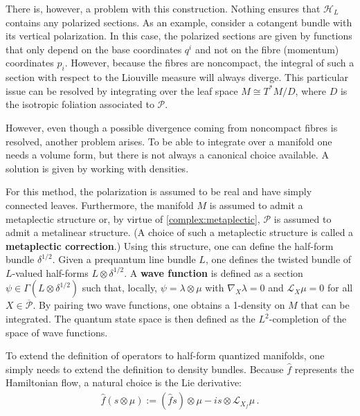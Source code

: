 \begin{construct}
        There is, however, a problem with this construction. Nothing ensures that $\mathcal{H}_L$ contains any polarized sections. As an example, consider a cotangent bundle with its vertical polarization. In this case, the polarized sections are given by functions that only depend on the base coordinates $q^i$ and not on the fibre (momentum) coordinates $p_i$. However, because the fibres are noncompact, the integral of such a section with respect to the Liouville measure will always diverge. This particular issue can be resolved by integrating over the leaf space $M\cong T^*M/D$, where $D$ is the isotropic foliation associated to $\mathcal{P}$.
    \end{construct}

    However, even though a possible divergence coming from noncompact fibres is resolved, another problem arises. To be able to integrate over a manifold one needs a volume form, but there is not always a canonical choice available. A solution is given by working with densities.
    \begin{method}\label{quantization:half_form}
        For this method, the polarization is assumed to be real and have simply connected leaves. Furthermore, the manifold $M$ is assumed to admit a metaplectic structure or, by virtue of \cref{complex:metaplectic}, $\mathcal{P}$ is assumed to admit a metalinear structure. (A choice of such a metaplectic structure is called a \textbf{metaplectic correction}.) Using this structure, one can define the half-form bundle $\delta^{1/2}$. Given a prequantum line bundle $L$, one defines the twisted bundle of $L$-valued half-forms $L\otimes\delta^{1/2}$. A \textbf{wave function} is defined as a section $\psi\in\Gamma(L\otimes\delta^{1/2})$ such that, locally, $\psi=\lambda\otimes\mu$ with $\nabla_X\lambda=0$ and $\mathcal{L}_X\mu=0$ for all $X\in\overline{\mathcal{P}}$. By pairing two wave functions, one obtains a 1-density on $M$ that can be integrated. The quantum state space is then defined as the $L^2$-completion of the space of wave functions.

        To extend the definition of operators to half-form quantized manifolds, one simply needs to extend the definition to density bundles. Because $\widehat{f}$ represents the Hamiltonian flow, a natural choice is the Lie derivative:
        \begin{gather}
            \widehat{f}(s\otimes\mu) := (\widehat{f}s)\otimes\mu - is\otimes\mathcal{L}_{X_f}\mu\,.
        \end{gather}
    \end{method}

